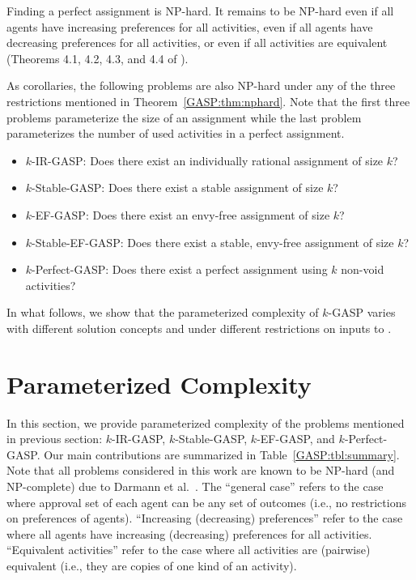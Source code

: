 \begin{theorem} \label{GASP:thm:nphard}
	Finding a perfect assignment is NP-hard.
	It remains to be NP-hard even if all agents have increasing preferences for all activities,
	even if all agents have decreasing preferences for all activities,
	or even if all activities are equivalent (Theorems 4.1, 4.2, 4.3, and 4.4 of \cite{GASP12WINE}).
\end{theorem}
As corollaries, the following problems are also NP-hard under any of the three restrictions mentioned in Theorem~\ref{GASP:thm:nphard}. Note that the first three problems parameterize the size of an assignment while the last problem parameterizes the number of used activities in a perfect assignment.
\begin{itemize}
	\item $k$-IR-GASP: Does there exist an individually rational assignment of size $k$?
	\item $k$-Stable-GASP: Does there exist a stable assignment of size $k$?
	\item $k$-EF-GASP: Does there exist an envy-free assignment of size $k$?
	\item $k$-Stable-EF-GASP: Does there exist a stable, envy-free assignment of size $k$?
	\item $k$-Perfect-GASP: Does there exist a perfect assignment using $k$ non-void activities?
\end{itemize}
In what follows, we show that the parameterized complexity of $k$-GASP varies with different solution concepts and under different restrictions on inputs to \GASP.





\section{Parameterized Complexity} \label{GASP:sec:results}

In this section, we provide parameterized complexity of the problems mentioned in previous section: $k$-IR-GASP, $k$-Stable-GASP, $k$-EF-GASP, and $k$-Perfect-GASP.
Our main contributions are summarized in Table~\ref{GASP:tbl:summary}.
Note that all problems considered in this work are known to be NP-hard (and NP-complete) due to Darmann et al.~\cite{GASP12WINE}.
The ``general case'' refers to the case where approval set of each agent can be any set of outcomes (i.e., no restrictions on preferences of agents). 
``Increasing (decreasing) preferences'' refer to the case where all agents have increasing (decreasing) preferences for all activities. 
``Equivalent activities'' refer to the case where all activities are (pairwise) equivalent (i.e., they are copies of one kind of an activity). 

